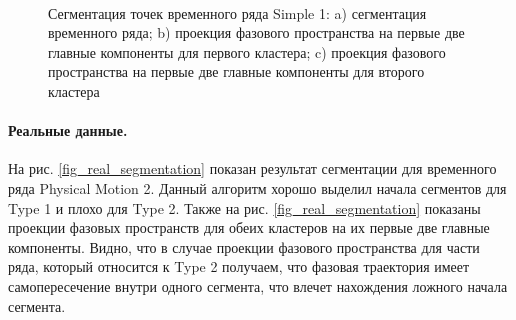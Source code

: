 \begin{figure}[h!t]\center
{}
\\
\caption{Сегментация точек временного ряда Simple 1: 
a) сегментация временного ряда; b) проекция фазового пространства на первые две главные компоненты для первого кластера; c) проекция фазового пространства на первые две главные компоненты для второго кластера}
\label{fig_simple_segmentation}
\end{figure}

\paragraph{Реальные данные.} На рис. \ref{fig_real_segmentation} показан результат сегментации для временного ряда Physical Motion 2. 
Данный алгоритм хорошо выделил начала сегментов для Type 1 и плохо для Type 2. 
Также на рис. \ref{fig_real_segmentation} показаны проекции фазовых пространств для обеих кластеров на их первые две главные компоненты. 
Видно, что в случае проекции фазового пространства для части ряда, который относится к Type 2 получаем, что фазовая траектория имеет самопересечение внутри одного сегмента, что влечет нахождения ложного начала сегмента.

